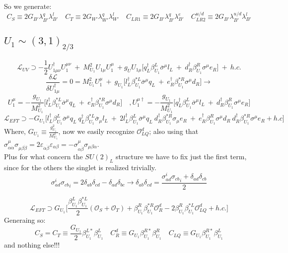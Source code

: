 \documentclass{article}
\begin{document}
So we generate:
\[
C_S\equiv  2 G_{B'} \lambda_{B'}^q \lambda_{B'}^l \quad C_T \equiv 2G_{W'} \lambda_{W'}^q \lambda_{W'}^l \quad C_{LR1} \equiv 2 G_{B'} \lambda_{B'}^q \lambda_{B'}^e \quad C_{LR2}^{u/d} \equiv 2 G_{B'} \lambda_{B'}^{u/d} \lambda_{B'}^l
\]


\subsection{$U_1 \sim (3,1)_{2/3}$}
\[
\mathcal{L}_{UV} \supset -\frac{1}{2} U_{1\mu \nu}^\dagger U^{\mu \nu}_1 \ + \ M_{U_1}^2 U_{1\mu}U_1^\mu  \ +
g_U U_{1\mu} \big[ q_L^\dagger \beta^L_{U_1} \overline{\sigma}^\mu l_L \ +  \ d_R^\dagger \beta^R_{U_1} \sigma^\mu e_R \big] \ + \ h.c. 
\]
\[
\frac{\delta \mathcal{L}}{\delta U_{1\mu}^\dagger} = 0 = M_{U_1}^2 U_1^\mu \ +\ g_{U_1} \big[ l_L^\dagger \beta^{*L}_{U_1} \overline{\sigma}^\mu q_L \ +  \ e_R^\dagger \beta^{*R}_{U_1} \sigma^\mu d_R\big] \rightarrow
\]
\[
U^\mu_1 = - \frac{g_{U_1}}{M^2_{U_1}} \big[ l_L^\dagger \beta^{*L}_{U_1} \overline{\sigma}^\mu q_L \ +  \ e_R^\dagger \beta^{*R}_{U_1} \sigma^\mu d_R \big] \quad, U^{\mu \dagger}_1 = -\frac{g_{U_1}}{M^2_{U_1}} \big[ q_L^\dagger \beta^L_{U_1} \overline{\sigma}^\mu l_L \ +  \ d_R^\dagger \beta^R_{U_1} \sigma^\mu e_R \big] 
\]
\[
\mathcal{L}_{EFT} \supset -G_{U_1}\big[ l_L^\dagger \beta^L_{U_1} \overline{\sigma}^\mu q_L \ q_L^\dagger \beta^{*L}_{U_1} \overline{\sigma}_\mu l_L \ +\  2l_L^\dagger \beta^L_{U_1} \overline{\sigma}^\mu q_L  \ d_R^\dagger \beta^{*R}_{U_1} \sigma_\mu e_R \  + \ e_R^\dagger \beta^R_{U_1} \sigma^\mu d_R \  d_R^\dagger \beta^{*R}_{U_1} \sigma^\mu e_R + h.c \big]
\]
Where, $G_{U_1} \equiv \frac{g^2_{U_1}}{M^2_{U_1}}$, now we easily recognize $\mathcal{O}^d_{LQ}$; also using that \\ $\sigma^\mu_{\alpha\dot{\alpha}} \sigma_{\mu\beta \dot{\beta}}=2 \varepsilon_{\dot{\alpha} \dot{\beta}} \varepsilon_{\alpha \beta}=- \sigma^\mu_{\alpha\dot{\beta}} \sigma_{\mu\beta \dot{\alpha}}$.\\
Plus for what concern the $SU(2)_L$ structure we have to fix just the first term, since for the others the singlet is realized trivially.
\[
\sigma^i_{ad} {\sigma_{cb}}_i = 2 \delta_{ab} \delta_{cd}- \delta_{ad}  \delta_{bc} \rightarrow \delta_{ab}\delta_{cd} = \frac{\sigma^i_{ad} {\sigma_{cb}}_i + \delta_{ad} \delta_{cb}}{2}
\]

\[
\mathcal{L}_{EFT} \supset G_{U_1}\big[\frac{\beta_{U_1}^L \beta_{U_1}^{*L}}{2}(\mathcal{O}_{S} + \mathcal{O}_{T}) + \beta_{U_1}^R \beta_{U_1}^{*R} \mathcal{O}^d_{R} - 2 \beta_{U_1}^R \beta_{U_1}^{*L} \mathcal{O}^d_{LQ} + h.c.]
\]
Generaing so:
\[
C_S = C_T \equiv \frac{G_{U_1}}{2} \beta_{U_1}^{L*} \beta_{U_1}^L \quad  C_R^d \equiv G_{U_1} \beta_{U_1}^{R*} \beta_{U_1}^R  \quad C_{LQ} \equiv G_{U_1} \beta_{U_1}^{R*} \beta_{U_1}^L 
\]
and nothing else!!!
\end{document}
